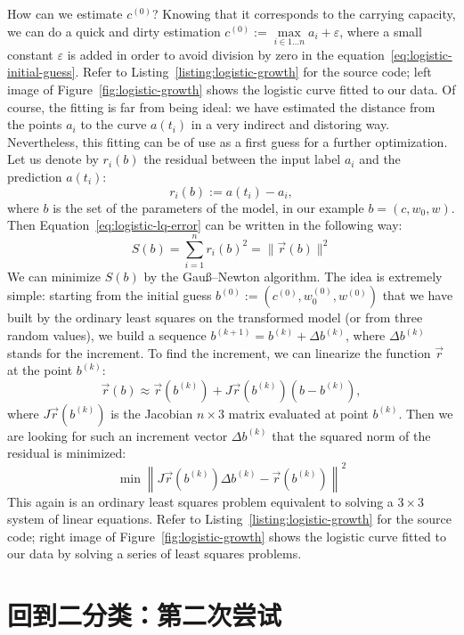 \documentclass[notitlepage,oneside]{book}
\begin{document}
How can we estimate $c^{(0)}$? Knowing that it corresponds to the carrying capacity, we can do a quick and dirty estimation $c^{(0)}:=\max\limits_{i\in 1\dots n} a_i + \varepsilon$, where a small constant $\varepsilon$ is added in order to avoid division by
zero in the equation~\eqref{eq:logistic-initial-guess}.
Refer to Listing~\ref{listing:logistic-growth} for the source code; left image of Figure~\ref{fig:logistic-growth} shows the logistic curve fitted to our data.
Of course, the fitting is far from being ideal: we have estimated the distance from the points $a_i$ to the curve $a(t_i)$ in a very indirect and distoring way.
Nevertheless, this fitting can be of use as a first guess for a further optimization.
Let us denote by $r_i(b)$ the residual between the input label $a_i$ and the prediction $a(t_i)$:
$$r_i(b) := a(t_i) - a_i,$$
where $b$ is the set of the parameters of the model, in our example $b=(c, w_0, w)$.
Then Equation~\eqref{eq:logistic-lq-error} can be written in the following way:
\begin{equation}
\label{eq:logistic-lq-error2}
S(b) = \sum\limits_{i=1}^n r_i(b)^2 = \|\vec{r}(b)\|^2
\end{equation}
We can minimize $S(b)$ by the Gauß–Newton algorithm.
The idea is extremely simple: starting from the initial guess 
$b^{(0)} := \left(c^{(0)}, w_0^{(0)}, w^{(0)}\right)$
that we have built by the ordinary least squares on the transformed model (or from three random values),
we build a sequence $b^{(k+1)} = b^{(k)} + \Delta b^{(k)}$,
where $\Delta b^{(k)}$ stands for the increment.%
To find the increment, we can linearize the function $\vec{r}$ at the point $b^{(k)}$:
$$
\vec{r}(b) \approx \vec{r}\left(b^{(k)}\right) + J\vec{r}\left(b^{(k)}\right) \left(b - b^{(k)}\right),
$$
where $J\vec{r}\left(b^{(k)}\right)$ is the Jacobian $n\times 3$ matrix evaluated at point $b^{(k)}$.
Then we are looking for such an increment vector $ \Delta b^{(k)}$ that the squared norm of the residual is minimized:
$$
\min \left\| J\vec{r}\left(b^{(k)}\right) \Delta b^{(k)} - \vec{r}\left(b^{(k)}\right) \right\|^2
$$
This again is an ordinary least squares problem equivalent to solving a $3\times 3$ system of linear equations.
Refer to Listing~\ref{listing:logistic-growth} for the source code; right image of Figure~\ref{fig:logistic-growth} shows the logistic curve fitted to our data
by solving a series of least squares problems.


\section{回到二分类：第二次尝试}
\label{sec:logistic1d}
\end{document}
